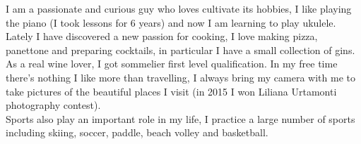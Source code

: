 \documentclass[10pt,a4paper]{altacv}
\begin{document}
I am a passionate and curious guy who loves cultivate its hobbies, I like playing the piano (I took lessons for 6 years) and now I am learning to play ukulele. Lately I have discovered a new passion for cooking, I love making pizza, panettone and preparing cocktails, in particular I have a small collection of gins. As a real wine lover, I got sommelier first level qualification. In my free time there's nothing I like more than travelling, I always bring my camera with me to take pictures of the beautiful places I visit (in 2015 I won Liliana Urtamonti photography contest).\\
Sports also play an important role in my life, I practice a large number of sports including skiing, soccer, paddle, beach volley and basketball. 
\end{document}
